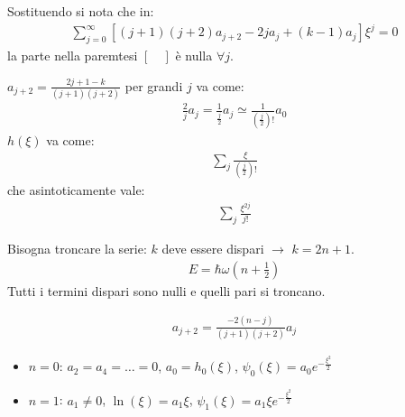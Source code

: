Sostituendo si nota che in:
\begin{equation}\begin{split}
\sum_{j=0}^{\infty }\left[\left(j+1\right)\left(j+2\right)a_{j+2}-2ja_j+\left(k-1\right)a_j\right]\xi^j=0
\end{split}\end{equation}
la parte nella paremtesi $\left[ \quad \right]$ è nulla $\forall j$.

$a_{j+2}=\frac{2j+1-k}{\left(j+1\right)\left(j+2\right)}$ per grandi $j$ va come:
\begin{equation}\begin{split}
\frac{2}{j}a_j=\frac{1}{\frac{j}{2}}a_j\simeq\frac{1}{\left(\frac{j}{2}\right)!}a_0
\end{split}\end{equation}
$h\left(\xi\right)$ va come:
\begin{equation}\begin{split}
\sum_{j}^{}\frac{\xi}{\left(\frac{j}{2}\right)!}
\end{split}\end{equation}
che asintoticamente vale:
\begin{equation}\begin{split}
\sum_{j}^{}\frac{\xi^{2j}}{j!}
\end{split}\end{equation}

Bisogna troncare la serie: $k$ deve essere dispari $\rightarrow$ $k=2n+1$.
\begin{equation}\begin{split}
E=\hbar \omega \left(n+\frac{1}{2}\right)
\end{split}\end{equation}
Tutti i termini dispari sono nulli e quelli pari si troncano.

\begin{equation}\begin{split}
a_{j+2}=\frac{-2\left(n-j\right)}{\left(j+1\right)\left(j+2\right)}a_j
\end{split}\end{equation}
\begin{itemize}
\item $n=0$: $a_2=a_4=\dots=0$, $a_0=h_0\left(\xi\right)$, $\psi _0\left(\xi\right)=a_0e^{-\frac{\xi^2}{2}}$
\item $n=1$: $a_1\neq 0$, $\ln\left(\xi\right)=a_1\xi$, $\psi _1\left(\xi\right)=a_1\xi e^{-\frac{\xi^2}{2}}$
\end{itemize}

